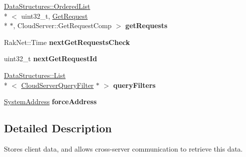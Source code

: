 \begin{DoxyCompactItemize}
\item 
\hypertarget{class_rak_net_1_1_cloud_server_a9049d88b0396b19ca7cb654786337475}{\hyperlink{class_data_structures_1_1_ordered_list}{Data\-Structures\-::\-Ordered\-List}\\*
$<$ uint32\-\_\-t, \hyperlink{struct_rak_net_1_1_cloud_server_1_1_get_request}{Get\-Request} \\*
$\ast$, Cloud\-Server\-::\-Get\-Request\-Comp $>$ {\bfseries get\-Requests}}\label{class_rak_net_1_1_cloud_server_a9049d88b0396b19ca7cb654786337475}

\item 
\hypertarget{class_rak_net_1_1_cloud_server_acaaa01fb20621a398f7648f968e1672b}{Rak\-Net\-::\-Time {\bfseries next\-Get\-Requests\-Check}}\label{class_rak_net_1_1_cloud_server_acaaa01fb20621a398f7648f968e1672b}

\item 
\hypertarget{class_rak_net_1_1_cloud_server_a6c33aa9559f95cc09a9d19c1ac3a5b1e}{uint32\-\_\-t {\bfseries next\-Get\-Request\-Id}}\label{class_rak_net_1_1_cloud_server_a6c33aa9559f95cc09a9d19c1ac3a5b1e}

\item 
\hypertarget{class_rak_net_1_1_cloud_server_a300b670f62b4d1885a35f02afac275dc}{\hyperlink{class_data_structures_1_1_list}{Data\-Structures\-::\-List}\\*
$<$ \hyperlink{class_rak_net_1_1_cloud_server_query_filter}{Cloud\-Server\-Query\-Filter} $\ast$ $>$ {\bfseries query\-Filters}}\label{class_rak_net_1_1_cloud_server_a300b670f62b4d1885a35f02afac275dc}

\item 
\hypertarget{class_rak_net_1_1_cloud_server_a671bd319e141f0d69bb49eec47a1d4b5}{\hyperlink{struct_rak_net_1_1_system_address}{System\-Address} {\bfseries force\-Address}}\label{class_rak_net_1_1_cloud_server_a671bd319e141f0d69bb49eec47a1d4b5}

\end{DoxyCompactItemize}


\subsection{Detailed Description}
Stores client data, and allows cross-\/server communication to retrieve this data. 

